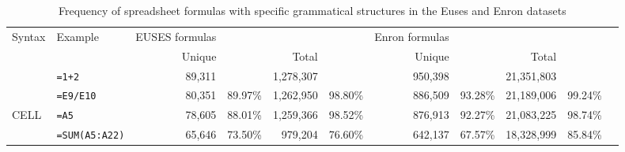 \documentclass[conference]{IEEEtran}
\begin{document}
\begin{table*}
	\label{table:occurences}
	\caption{Frequency of spreadsheet formulas with specific grammatical structures in the Euses and Enron datasets}
	\begin{tabular}{llrrrrrrrrr}
		\hline
		Syntax & Example & EUSES formulas &  &  &  & Enron formulas &  &  & \\
		&  & Unique &  & Total &  & Unique &  & Total & \\
		\hline
		\synt{Formula} & \texttt{=1+2} & 89,311 &  & 1,278,307 &  & 950,398 &  & 21,351,803 & \\
		\synt{Reference} & \texttt{=E9/E10} & 80,351 & 89.97\% & 1,262,950 & 98.80\% & 886,509 & 93.28\% & 21,189,006 & 99.24\%\\
		CELL & \texttt{=A5} & 78,605 & 88.01\% & 1,259,366 & 98.52\% & 876,913 & 92.27\% & 21,083,225 & 98.74\%\\
		\synt{FunctionCall} & \texttt{=SUM(A5:A22)} & 65,646 & 73.50\% & 979,204 & 76.60\% & 642,137 & 67.57\% & 18,328,999 & 85.84\%\\
		

\end{tabular}
\end{table*}
\end{document}
